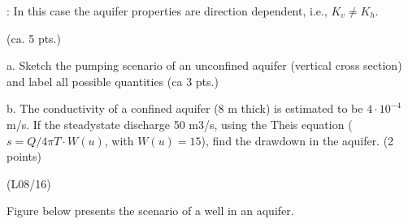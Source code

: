 \documentclass[letterpaper,10pt,english]{jupyterBook}
\begin{document}
\sphinxAtStartPar
{}: In this case the aquifer properties are direction dependent, i.e., \(K_v \neq K_h\).

\sphinxAtStartPar
{} (ca. 5 pts.)

\sphinxAtStartPar
a. Sketch the pumping scenario of an unconfined aquifer (vertical cross section) and label all possible quantities (ca 3 pts.)

\sphinxAtStartPar
b. The conductivity of a confined aquifer (8 m thick) is estimated to be \(4\cdot 10^{-4}\) m/s. If the steady\sphinxhyphen{}state discharge 50 m3/s, using the Theis equation (\(s = Q/4\pi T·W(u)\), with \(W(u) = 15\)), find the drawdown in the aquifer. (2 points)

\sphinxAtStartPar
{}
(L08/16)

\sphinxAtStartPar
Figure below presents the scenario of a well in an  aquifer.
\end{document}
